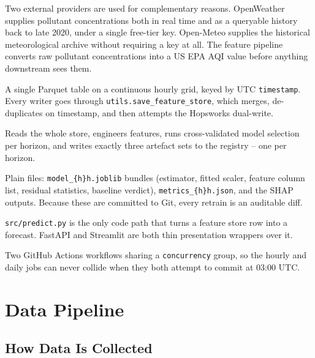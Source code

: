 \documentclass[11pt,a4paper]{article}
\begin{document}
\begin{description}[leftmargin=0pt,style=nextline,itemsep=3pt]
  \item[Ingestion layer.] Two external providers are used for complementary
    reasons. OpenWeather supplies pollutant concentrations both in real time
    and as a queryable history back to late 2020, under a single free-tier
    key. Open-Meteo supplies the historical meteorological archive without
    requiring a key at all. The feature pipeline converts raw pollutant
    concentrations into a US EPA AQI value before anything downstream sees
    them.
  \item[Feature store layer.] A single Parquet table on a continuous hourly
    grid, keyed by UTC \texttt{timestamp}. Every writer goes through
    \texttt{utils.save\_feature\_store}, which merges, de-duplicates on
    timestamp, and then attempts the Hopsworks dual-write.
  \item[Training layer.] Reads the whole store, engineers features, runs
    cross-validated model selection per horizon, and writes exactly three
    artefact sets to the registry -- one per horizon.
  \item[Registry layer.] Plain files: \texttt{model\_\{h\}h.joblib} bundles
    (estimator, fitted scaler, feature column list, residual statistics,
    baseline verdict), \texttt{metrics\_\{h\}h.json}, and the SHAP outputs.
    Because these are committed to Git, every retrain is an auditable diff.
  \item[Serving layer.] \texttt{src/predict.py} is the only code path that
    turns a feature store row into a forecast. FastAPI and Streamlit are both
    thin presentation wrappers over it.
  \item[Automation layer.] Two GitHub Actions workflows sharing a
    \texttt{concurrency} group, so the hourly and daily jobs can never
    collide when they both attempt to commit at 03:00 UTC.
\end{description}

\section{Data Pipeline}

\subsection{How Data Is Collected}
\end{document}
